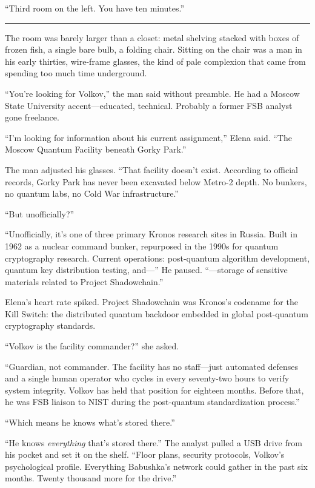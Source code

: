 \documentclass[12pt,letterpaper]{book}
\begin{document}
``Third room on the left. You have ten minutes.''

\begin{center}\rule{0.5\linewidth}{0.5pt}\end{center}

The room was barely larger than a closet: metal shelving stacked with boxes of frozen fish, a single bare bulb, a folding chair. Sitting on the chair was a man in his early thirties, wire-frame glasses, the kind of pale complexion that came from spending too much time underground.

``You're looking for Volkov,'' the man said without preamble. He had a Moscow State University accent---educated, technical. Probably a former FSB analyst gone freelance.

``I'm looking for information about his current assignment,'' Elena said. ``The Moscow Quantum Facility beneath Gorky Park.''

The man adjusted his glasses. ``That facility doesn't exist. According to official records, Gorky Park has never been excavated below Metro-2 depth. No bunkers, no quantum labs, no Cold War infrastructure.''

``But unofficially?''

``Unofficially, it's one of three primary Kronos research sites in Russia. Built in 1962 as a nuclear command bunker, repurposed in the 1990s for quantum cryptography research. Current operations: post-quantum algorithm development, quantum key distribution testing, and---'' He paused. ``---storage of sensitive materials related to Project Shadowchain.''

Elena's heart rate spiked. Project Shadowchain was Kronos's codename for the Kill Switch: the distributed quantum backdoor embedded in global post-quantum cryptography standards.

``Volkov is the facility commander?'' she asked.

``Guardian, not commander. The facility has no staff---just automated defenses and a single human operator who cycles in every seventy-two hours to verify system integrity. Volkov has held that position for eighteen months. Before that, he was FSB liaison to NIST during the post-quantum standardization process.''

``Which means he knows what's stored there.''

``He knows \emph{everything} that's stored there.'' The analyst pulled a USB drive from his pocket and set it on the shelf. ``Floor plans, security protocols, Volkov's psychological profile. Everything Babushka's network could gather in the past six months. Twenty thousand more for the drive.''
\end{document}
